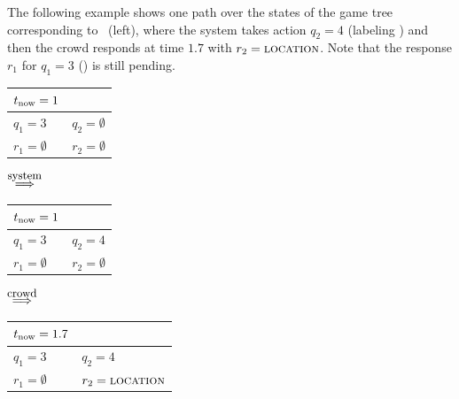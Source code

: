 The following example shows one path over the states of the game tree corresponding to ~(left),
where the system takes action $q_2 = 4$ (labeling ) and then the crowd responds
at time $1.7$ with $r_2 = \textsc{location}$.
Note that the response $r_1$ for $q_1 = 3$ () is still pending.
\begin{center}
\begin{tabular}{|ll|}
  \hline $t_\text{now} = 1$ & \\
  \hline
  $q_1 = 3$         & $q_2 = \emptyset$ \\
  $r_1 = \emptyset$ & $r_2 = \emptyset$ \\
  \hline
\end{tabular}
$\stackrel{\text{\small system}}{\implies}$
\begin{tabular}{|ll|}
  \hline $t_\text{now} = 1$ & \\
  \hline
  $q_1 = 3$         & $q_2 = 4$ \\
  $r_1 = \emptyset$ & $r_2 = \emptyset$ \\
  \hline
\end{tabular}
$\stackrel{\text{\small crowd}}{\implies}$
\begin{tabular}{|ll|}
  \hline $t_\text{now} = 1.7$ & \\
  \hline
  $q_1 = 3$         & $q_2 = 4$ \\
  $r_1 = \emptyset$ & $r_2 = \text{\textsc{location}}$ \\
  \hline
\end{tabular}
\end{center}



